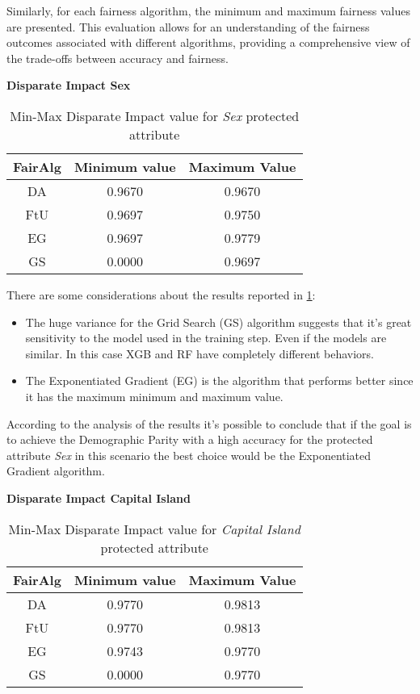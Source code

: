 Similarly, for each fairness algorithm, the minimum and maximum fairness values are presented. This evaluation allows for an understanding of the fairness outcomes associated with different algorithms, providing a comprehensive view of the trade-offs between accuracy and fairness.

\textbf{Disparate Impact Sex}
\begin{table}
    \centering
    \begin{tabular}{|c|c|c|}
        \hline
        \textbf{FairAlg} & \textbf{Minimum value} & \textbf{Maximum Value} \\
        \hline
        DA & 0.9670 & 0.9670 \\
        \hline
        FtU & 0.9697 & 0.9750 \\
        \hline
        EG & 0.9697 & 0.9779 \\
        \hline
        GS & 0.0000 & 0.9697 \\
        \hline
    \end{tabular}
    \caption{Min-Max Disparate Impact value for \emph{Sex} protected attribute}
    \label{tab:s_di}
\end{table}

There are some considerations about the results reported in \cref{tab:s_di}:

\begin{itemize}

    \item The huge variance for the Grid Search (GS) algorithm suggests that it's great sensitivity to the model used in the training step. Even if the models are similar. In this case XGB and RF have completely different behaviors.

    \item The Exponentiated Gradient (EG) is the algorithm that performs better since it has the maximum minimum and maximum value.

\end{itemize}

According to the analysis of the results it's possible to conclude that if the goal is to achieve the Demographic Parity with a high accuracy for the protected attribute \emph{Sex} in this scenario the best choice would be the Exponentiated Gradient algorithm.


\textbf{Disparate Impact Capital Island}
\begin{table}
    \centering
    \begin{tabular}{|c|c|c|}
        \hline
        \textbf{FairAlg} & \textbf{Minimum value} & \textbf{Maximum Value} \\
        \hline
        DA & 0.9770 & 0.9813 \\
        \hline
        FtU & 0.9770 & 0.9813 \\
        \hline
        EG & 0.9743 & 0.9770 \\
        \hline
        GS & 0.0000 & 0.9770 \\
        \hline
    \end{tabular}
    \caption{Min-Max Disparate Impact value for \emph{Capital Island} protected attribute}
    \label{tab:ci_di}
\end{table}


